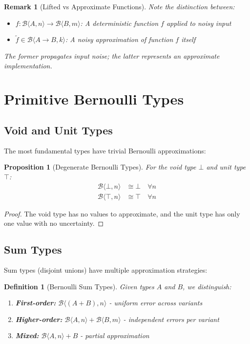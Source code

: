 \documentclass[11pt,final,hidelinks]{article}
\newtheorem{proposition}[theorem]{Proposition}
\newtheorem{definition}[theorem]{Definition}
\newtheorem{remark}[theorem]{Remark}
\newcommand{\bernoulli}[2]{\mathcal{B}\langle #1, #2 \rangle}
\begin{document}
\begin{remark}[Lifted vs Approximate Functions]
Note the distinction between:
\begin{itemize}
    \item $f: \bernoulli{A}{n} \to \bernoulli{B}{m}$: A deterministic function $f$ applied to noisy input
    \item $\tilde{f} \in \bernoulli{A \to B}{k}$: A noisy approximation of function $f$ itself
\end{itemize}
The former propagates input noise; the latter represents an approximate implementation.
\end{remark}

\section{Primitive Bernoulli Types}

\subsection{Void and Unit Types}

The most fundamental types have trivial Bernoulli approximations:

\begin{proposition}[Degenerate Bernoulli Types]
For the void type $\bot$ and unit type $\top$:
\begin{align}
\bernoulli{\bot}{n} &\cong \bot \quad \forall n \\
\bernoulli{\top}{n} &\cong \top \quad \forall n
\end{align}
\end{proposition}

\begin{proof}
The void type has no values to approximate, and the unit type has only one value with no uncertainty.
\end{proof}

\subsection{Sum Types}

Sum types (disjoint unions) have multiple approximation strategies:

\begin{definition}[Bernoulli Sum Types]
Given types $A$ and $B$, we distinguish:
\begin{enumerate}
    \item \textbf{First-order:} $\bernoulli{(A + B)}{n}$ - uniform error across variants
    \item \textbf{Higher-order:} $\bernoulli{A}{n} + \bernoulli{B}{m}$ - independent errors per variant
    \item \textbf{Mixed:} $\bernoulli{A}{n} + B$ - partial approximation
\end{enumerate}
\end{definition}
\end{document}
